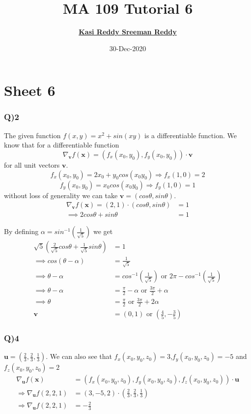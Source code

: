 \documentclass[11pt]{beamer}
\author[K. Sreeman Reddy]{\href{http://iamsreeman.github.io/}{\textbf{Kasi Reddy Sreeman Reddy}}\linebreak\text{2nd year physics student}\linebreak\text{\href{http://iamsreeman.github.io/MA109}{http://iamsreeman.github.io/MA109}}}
\title{MA 109 Tutorial 6}
\institute[]{IIT Bombay}
\date{30-Dec-2020}
\begin{document}
\begin{frame}
\titlepage
\end{frame}


\section{Sheet 6}
\begin{frame}
\frametitle{Q)2}
The given function $f(x,y)=x^2+sin(xy)$ is a differentiable function. We know that for a differentiable function
$$\nabla_{\textbf{v}}f(\textbf{x})=(f_x(x_0,y_0),f_y(x_0,y_0))\cdot \textbf{v}$$
for all unit vectors $\textbf{v}$. 
$$f_x(x_0,y_0)=2x_0+y_0cos(x_0y_0)\Rightarrow f_x(1,0)=2$$
$$f_y(x_0,y_0)=x_0cos(x_0y_0)\Rightarrow f_y(1,0)=1$$
without loss of generality we can take $\textbf{v}=(cos\theta,sin\theta)$.
\begin{align*}
\nabla_{\textbf{v}}f(\textbf{x})=(2,1)\cdot (cos\theta,sin\theta)&=1\\
\implies 2cos\theta+sin\theta&=1
\end{align*}
\end{frame}
\begin{frame}
By defining $\alpha=sin^{-1}(\frac{1}{\sqrt{5}})$ we get
\begin{align*}
 \sqrt{5}(\frac{2}{\sqrt{5}}cos\theta+\frac{1}{\sqrt{5}}sin\theta)&=1\\
 \implies cos(\theta-\alpha)&=\frac{1}{\sqrt{5}}\\
 \implies \theta-\alpha&=cos^{-1}(\frac{1}{\sqrt{5}}) \text{ or } 2\pi-cos^{-1}(\frac{1}{\sqrt{5}})\\
 \implies \theta-\alpha&=\frac{\pi}{2}-\alpha \text{ or } \frac{3\pi}{2}+\alpha \\
  \implies \theta&=\frac{\pi}{2} \text{ or } \frac{3\pi}{2}+2\alpha \\
  \textbf{v}&=(0,1)\text{ or }(\frac{4}{5},-\frac{3}{5})
\end{align*}
\end{frame}
\begin{frame}
\frametitle{Q)4}
$\textbf{u}=(\frac{2}{3},\frac{2}{3},\frac{1}{3})$. We can also see that $f_x(x_0,y_0,z_0)=3$,$f_y(x_0,y_0,z_0)=-5$ and $f_z(x_0,y_0,z_0)=2$
\begin{align*}
\nabla_{\textbf{u}}f(\textbf{x})&=(f_x(x_0,y_0,z_0),f_y(x_0,y_0,z_0),f_z(x_0,y_0,z_0))\cdot \textbf{u}\\
\Rightarrow\nabla_{\textbf{u}}f(2,2,1)&=(3,-5,2)\cdot (\frac{2}{3},\frac{2}{3},\frac{1}{3})\\
\Rightarrow\nabla_{\textbf{u}}f(2,2,1)&=-\frac{2}{3}
\end{align*}
\end{frame}
\end{document}
